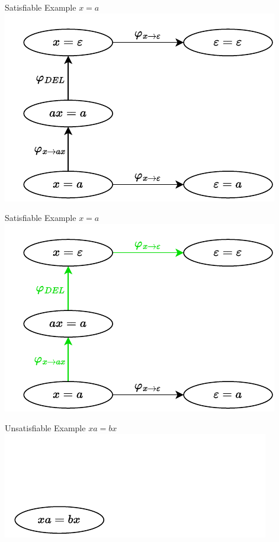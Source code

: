 \documentclass[xcolor=table]{beamer}
\begin{document}
\begin{frame}{Satisfiable Example $x = a$}
\includegraphics[]{images/x_a/x_a-5.pdf}
\end{frame}

\begin{frame}{Satisfiable Example $x = a$}
\includegraphics[]{images/x_a/x_a-6.pdf}
\end{frame}

\begin{frame}{Unsatisfiable Example $xa = bx$}
\includegraphics[]{images/xa_bx/xa_bx-0.pdf}
\end{frame}
\end{document}
